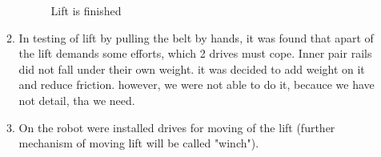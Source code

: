\begin{enumerate}
\begin{enumerate}
      \begin{figure}[H]
      	\begin{minipage}[h]{1\linewidth}
      		\caption{Lift is finished}
      	\end{minipage}
      \end{figure}
      
      \item	In testing of lift by pulling the belt by hands, it was found that apart of the lift demands some efforts, which 2 drives must cope. Inner pair rails did not fall under their own weight. it was decided to add weight on it and reduce friction. however, we were not able to do it, becauce we have not detail, tha we need.
      
      \item	On the robot were installed drives for moving of the lift (further mechanism of moving lift will be called "winch").
      

\end{enumerate}
\end{enumerate}
